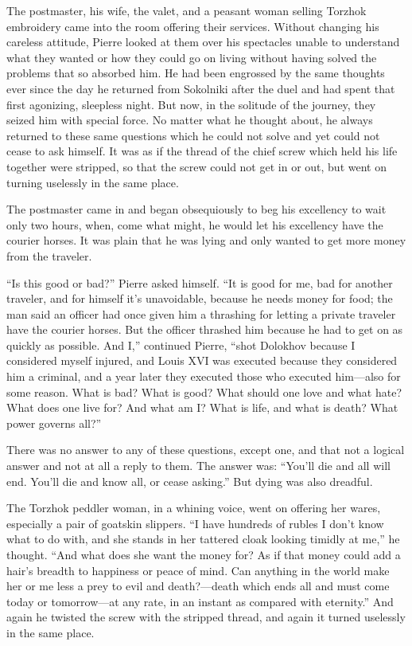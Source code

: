 The postmaster, his wife, the valet, and a peasant woman selling
Torzhok embroidery came into the room offering their
services. Without changing his careless attitude, Pierre looked
at them over his spectacles unable to understand what they wanted
or how they could go on living without having solved the problems
that so absorbed him. He had been engrossed by the same thoughts
ever since the day he returned from Sokolniki after the duel and
had spent that first agonizing, sleepless night. But now, in the
solitude of the journey, they seized him with special force. No
matter what he thought about, he always returned to these same
questions which he could not solve and yet could not cease to ask
himself. It was as if the thread of the chief screw which held
his life together were stripped, so that the screw could not get
in or out, but went on turning uselessly in the same place.

The postmaster came in and began obsequiously to beg his
excellency to wait only two hours, when, come what might, he
would let his excellency have the courier horses. It was plain
that he was lying and only wanted to get more money from the
traveler.

``Is this good or bad?'' Pierre asked himself. ``It is good for
me, bad for another traveler, and for himself it's unavoidable,
because he needs money for food; the man said an officer had once
given him a thrashing for letting a private traveler have the
courier horses. But the officer thrashed him because he had to
get on as quickly as possible. And I,'' continued Pierre, ``shot
Dolokhov because I considered myself injured, and Louis XVI was
executed because they considered him a criminal, and a year later
they executed those who executed him---also for some reason.
What is bad? What is good? What should one love and what hate?
What does one live for? And what am I? What is life, and what is
death? What power governs all?''

There was no answer to any of these questions, except one, and
that not a logical answer and not at all a reply to them. The
answer was: ``You'll die and all will end. You'll die and know
all, or cease asking.'' But dying was also dreadful.

The Torzhok peddler woman, in a whining voice, went on offering
her wares, especially a pair of goatskin slippers. ``I have
hundreds of rubles I don't know what to do with, and she stands
in her tattered cloak looking timidly at me,'' he thought. ``And
what does she want the money for? As if that money could add a
hair's breadth to happiness or peace of mind. Can anything in the
world make her or me less a prey to evil and death?---death which
ends all and must come today or tomorrow---at any rate, in an
instant as compared with eternity.'' And again he twisted the
screw with the stripped thread, and again it turned uselessly in
the same place.

